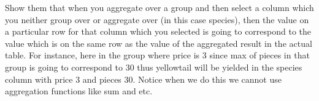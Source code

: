 
\begin{meta}
    Show them that when you aggregate over a group and then select a column which you neither group over or aggregate over (in this case species), then the value on a particular row for that column which you selected is going to correspond to the value which is on the same row as the value of the aggregated result in the actual table. For instance, here in the group where price is 3 since max of pieces in that group is going to correspond to 30 thus yellowtail will be yielded in the species column with price 3 and pieces 30. Notice when we do this we cannot use aggregation functions like sum and etc.
\end{meta}